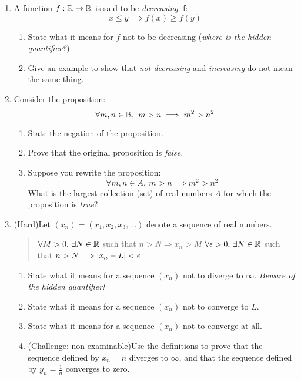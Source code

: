 \begin{exercises}{}{}
\begin{enumerate}
			
		\item\label{ex:decreasing} A function $f:\mathbb{R}\to\mathbb{R}$ is said to be \emph{decreasing} if:
		\[
			x\le y\implies f(x)\ge f(y)
		\]
		\begin{enumerate}
		  \item State what it means for $f$ not to be decreasing (\emph{where is the hidden quantifier?})
		  \item Give an example to show that \emph{not decreasing} and \emph{increasing} do not mean the same thing.
		\end{enumerate}
		
			
		\item Consider the proposition:
		\[
			\forall m,n\in\mathbb{R},\  m>n\implies m^2>n^2
		\]
		\begin{enumerate}
	  	\item State the negation of the proposition.
	  	\item Prove that the original proposition is \emph{false.}
	  	\item Suppose you rewrite the proposition:
	  	\[
	  		\forall m,n\in A, \ m>n\implies m^2>n^2
	  	\]
	  	What is the largest collection (set) of real numbers $A$ for which the proposition is \emph{true}?
		\end{enumerate}
	
		
		\item (Hard)\lstsp Let $(x_n)=(x_1,x_2,x_3,\ldots)$ denote a sequence of real numbers.
		\begin{quote}
			$\forall M>0,\,\exists N\in\mathbb{R}$ such that $n>N\Longrightarrow x_n>M$\smallbreak
			$\forall\epsilon>0,\,\exists N\in\mathbb{R}$ such that $n>N\Longrightarrow \left| x_n-L\right|<\epsilon$
		\end{quote}
		\begin{enumerate}
		  \item State what it means for a sequence $(x_n)$ not to diverge to $\infty$. \emph{Beware of the hidden quantifier!}
		  \item State what it means for a sequence $(x_n)$ not to converge to $L$.
		  \item State what it means for a sequence $(x_n)$ not to converge at all.
		  \item (Challenge: non-examinable)\lstsp Use the definitions to prove that the sequence defined by $x_n=n$ diverges to $\infty$, and that the sequence defined by $y_n=\frac 1n$ converges to zero.
		\end{enumerate}
	
	\end{enumerate}

\end{exercises}


